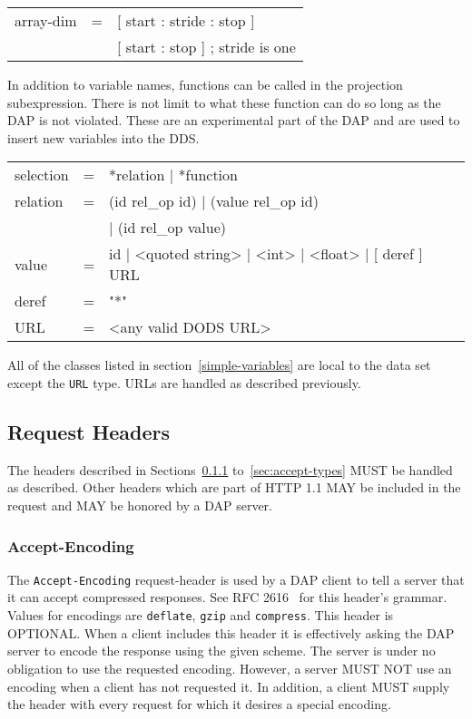 \documentclass{article}
\begin{document}
\begin{ttfamily}
\begin{center}
\begin{tabular}{lll}
array-dim & = & [ start : stride : stop ] \\
          & & [ start : stop ] ; stride is one \\
\end{tabular}
\end{center}
\end{ttfamily}

In addition to variable names, functions can be called in the projection
subexpression. There is not limit to what these function can do so long as
the \ac{DAP} is not violated. These are an experimental part of the \ac{DAP}
and are used to insert new variables into the \ac{DDS}. 

\begin{ttfamily}
\begin{center}
\begin{tabular}{lll}
selection & = & *relation | *function \\
relation & = & (id rel\_op id) | (value rel\_op id) \\
         & & | (id rel\_op value) \\
value & = & id | <quoted string> | <int> | <float> | [ deref ] URL \\
deref & = & "*" \\
URL & = & <any valid DODS URL> \\
\end{tabular}
\end{center}
\end{ttfamily}

All of the classes listed in section~\ref{simple-variables} are local to the
data set except the \texttt{URL} type. \ac{URL}s are handled as described
previously.

\subsection{Request Headers}

The headers described in Sections~\ref{sec:accept-encoding}
to~\ref{sec:accept-types} MUST be handled as described. Other headers which
are part of \ac{HTTP} 1.1 MAY be included in the request and MAY be honored
by a \ac{DAP} server.

\subsubsection{Accept-Encoding}
\label{sec:accept-encoding}
The \texttt{Accept-Encoding} request-header is used by a \ac{DAP} client to
tell a server that it can accept compressed responses. See RFC
2616~\cite{rfc2616} for this header's grammar.  Values for encodings are
\texttt{deflate}, \texttt{gzip} and \texttt{compress}. This header is
OPTIONAL. When a client includes this header it is effectively asking the
\ac{DAP} server to encode the response using the given scheme. The server is
under no obligation to use the requested encoding. However, a server MUST NOT
use an encoding when a client has not requested it. In addition, a client
MUST supply the header with every request for which it desires a special
encoding.
\end{document}
